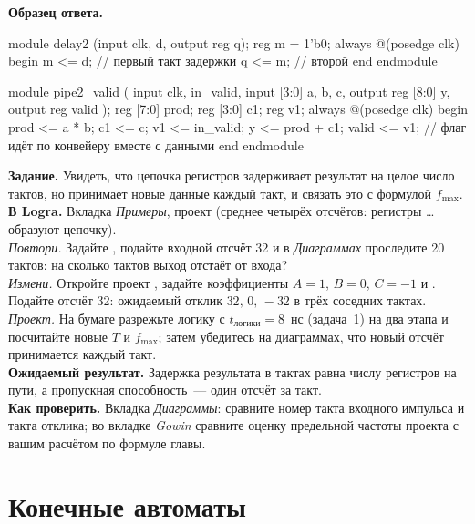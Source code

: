 \textbf{Образец ответа.}
\begin{vcode}
module delay2 (input clk, d, output reg q);
    reg m = 1'b0;
    always @(posedge clk) begin
        m <= d;      // первый такт задержки
        q <= m;      // второй
    end
endmodule

module pipe2_valid (
    input            clk, in_valid,
    input      [3:0] a, b, c,
    output reg [8:0] y,
    output reg       valid
);
    reg [7:0] prod;
    reg [3:0] c1;
    reg       v1;
    always @(posedge clk) begin
        prod <= a * b;  c1 <= c;  v1 <= in_valid;
        y    <= prod + c1;        valid <= v1;   // флаг идёт по конвейеру вместе с данными
    end
endmodule
\end{vcode}

\begin{diybox}
\textbf{Задание.} Увидеть, что цепочка регистров задерживает результат на
целое число тактов, но принимает новые данные каждый такт, и связать это с
формулой $f_\text{max}$.\\
\textbf{В Logra.} Вкладка \emph{Примеры}, проект 
(среднее четырёх отсчётов: регистры \ldots{} образуют
цепочку).\\
 \emph{Повтори.} Задайте , подайте входной
отсчёт 32 и в \emph{Диаграммах} проследите 20 тактов: на сколько тактов
выход отстаёт от входа?\\
 \emph{Измени.} Откройте проект , задайте
коэффициенты $A=1$, $B=0$, $C=-1$ и . Подайте отсчёт 32:
ожидаемый отклик $32,\,0,\,-32$ в трёх соседних тактах.\\
 \emph{Проект.} На бумаге разрежьте логику с $t_\text{логики}=8$~нс
(задача~1) на два этапа и посчитайте новые $T$ и $f_\text{max}$; затем
убедитесь на диаграммах, что новый отсчёт принимается каждый такт.\\
\textbf{Ожидаемый результат.} Задержка результата в тактах равна числу
регистров на пути, а пропускная способность~--- один отсчёт за такт.\\
\textbf{Как проверить.} Вкладка \emph{Диаграммы}: сравните номер такта
входного импульса и такта отклика; во вкладке \emph{Gowin} сравните оценку
предельной частоты проекта с вашим расчётом по формуле главы.
\end{diybox}

\section{Конечные автоматы}

